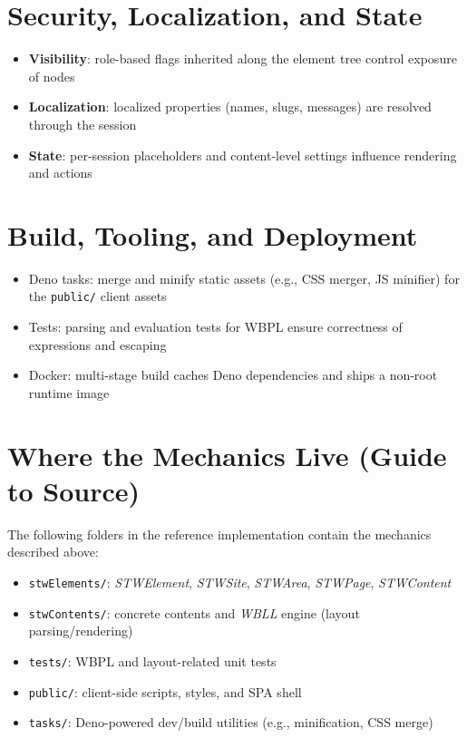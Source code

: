 \section{Security, Localization, and State}
\begin{itemize}
  \item \textbf{Visibility}: role-based flags inherited along the element tree control exposure of nodes
  \item \textbf{Localization}: localized properties (names, slugs, messages) are resolved through the session
  \item \textbf{State}: per-session placeholders and content-level settings influence rendering and actions
\end{itemize}

\section{Build, Tooling, and Deployment}
\begin{itemize}
  \item Deno tasks: merge and minify static assets (e.g., CSS merger, JS minifier) for the \texttt{public/} client assets
  \item Tests: parsing and evaluation tests for WBPL ensure correctness of expressions and escaping
  \item Docker: multi-stage build caches Deno dependencies and ships a non-root runtime image
\end{itemize}

\section{Where the Mechanics Live (Guide to Source)}
The following folders in the reference implementation contain the mechanics described above:
\begin{itemize}
  \item \texttt{stwElements/}: \textit{STWElement}, \textit{STWSite}, \textit{STWArea}, \textit{STWPage}, \textit{STWContent}
  \item \texttt{stwContents/}: concrete contents and \textit{WBLL} engine (layout parsing/rendering)
  \item \texttt{tests/}: WBPL and layout-related unit tests
  \item \texttt{public/}: client-side scripts, styles, and SPA shell
  \item \texttt{tasks/}: Deno-powered dev/build utilities (e.g., minification, CSS merge)
\end{itemize}

